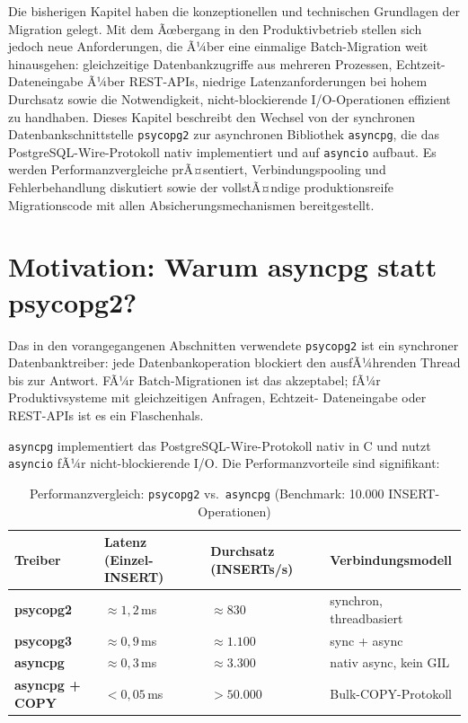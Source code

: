 ﻿\documentclass[12pt,a4paper]{report}
\theoremstyle{definition}
\theoremstyle{remark}
\newcommand{\psycopg}{\texttt{psycopg2}}
\newcommand{\asyncpg}{\texttt{asyncpg}}
\newcommand{\code}[1]{\texttt{#1}}
\begin{document}
Die bisherigen Kapitel haben die konzeptionellen und technischen Grundlagen der Migration gelegt. Mit dem Ãœbergang in den Produktivbetrieb stellen sich jedoch neue Anforderungen, die Ã¼ber eine einmalige Batch-Migration weit hinausgehen: gleichzeitige Datenbankzugriffe aus mehreren Prozessen, Echtzeit-Dateneingabe Ã¼ber REST-APIs, niedrige Latenzanforderungen bei hohem Durchsatz sowie die Notwendigkeit, nicht-blockierende I/O-Operationen effizient zu handhaben. Dieses Kapitel beschreibt den Wechsel von der synchronen Datenbankschnittstelle \psycopg{} zur asynchronen Bibliothek \asyncpg{}, die das PostgreSQL-Wire-Protokoll nativ implementiert und auf \code{asyncio} aufbaut. Es werden Performanzvergleiche prÃ¤sentiert, Verbindungspooling und Fehlerbehandlung diskutiert sowie der vollstÃ¤ndige produktionsreife Migrationscode mit allen Absicherungsmechanismen bereitgestellt.

\section{Motivation: Warum asyncpg statt psycopg2?}

Das in den vorangegangenen Abschnitten verwendete \psycopg{} ist ein
synchroner Datenbanktreiber: jede Datenbankoperation blockiert den
ausfÃ¼hrenden Thread bis zur Antwort. FÃ¼r Batch-Migrationen ist das
akzeptabel; fÃ¼r Produktivsysteme mit gleichzeitigen Anfragen, Echtzeit-
Dateneingabe oder REST-APIs ist es ein Flaschenhals.

\asyncpg{} implementiert das PostgreSQL-Wire-Protokoll nativ in C und
nutzt \code{asyncio} fÃ¼r nicht-blockierende I/O. Die Performanzvorteile
sind signifikant:

\begin{table}[H]
\centering
\caption{Performanzvergleich: \psycopg{} vs.\ \asyncpg{} (Benchmark: 10.000 INSERT-Operationen)}
\label{tab:perf}
\renewcommand{\arraystretch}{1.3}
\begin{tabularx}{\linewidth}{>{\bfseries\footnotesize}l >{\footnotesize}X >{\footnotesize}X >{\footnotesize}X}
\toprule
Treiber      & Latenz (Einzel-INSERT) & Durchsatz (INSERTs/s) & Verbindungsmodell \\
\midrule
psycopg2     & $\approx 1{,}2$\,ms    & $\approx 830$         & synchron, threadbasiert \\
psycopg3     & $\approx 0{,}9$\,ms    & $\approx 1.100$       & sync + async \\
asyncpg      & $\approx 0{,}3$\,ms    & $\approx 3.300$       & nativ async, kein GIL \\
asyncpg + COPY & $< 0{,}05$\,ms     & $> 50.000$            & Bulk-COPY-Protokoll \\
\bottomrule
\end{tabularx}
\end{table}
\end{document}
